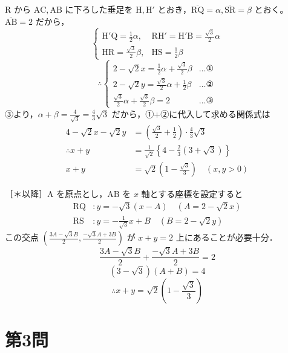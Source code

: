 \documentclass[../main.tex]{subfiles}
\begin{document}
$\mathrm{R}$ から $\mathrm{AC}, \mathrm{AB}$ に下ろした垂足を $\mathrm{H}, \mathrm{H'}$ とおき，$\overline{\mathrm{RQ}} = \alpha, \overline{\mathrm{SR}} = \beta$ とおく。$\overline{\mathrm{AB}} = 2$ だから，
\[
  \begin{cases}
    \mathrm{H'Q} = \frac{1}{2}\alpha, & \mathrm{RH'} = \mathrm{H'B} = \frac{\sqrt{3}}{2}\alpha \\[1ex]
    \mathrm{HR} = \frac{\sqrt{3}}{2}\beta, & \mathrm{HS} = \frac{1}{2}\beta
  \end{cases}
\]
\[
  \therefore
  \begin{cases}
    2 - \sqrt{2}x = \frac{1}{2}\alpha + \frac{\sqrt{3}}{2}\beta & \dots \text{①} \\[1ex]
    2 - \sqrt{2}y = \frac{\sqrt{3}}{2}\alpha + \frac{1}{2}\beta & \dots \text{②} \\[1ex]
    \frac{\sqrt{3}}{2}\alpha + \frac{\sqrt{3}}{2}\beta = 2 & \dots \text{③}
  \end{cases}
\]
③より，$\alpha + \beta = \frac{4}{\sqrt{3}} = \frac{4}{3}\sqrt{3}$ だから，①+②に代入して求める関係式は
\begin{align*}
  4 - \sqrt{2}x - \sqrt{2}y &= \left( \frac{\sqrt{3}}{2} + \frac{1}{2} \right) \cdot \frac{4}{3}\sqrt{3} \\
  \therefore x + y &= \frac{1}{\sqrt{2}} \left\{ 4 - \frac{2}{3}(3+\sqrt{3}) \right\} \\
  x + y &= \sqrt{2}\left( 1 - \frac{\sqrt{3}}{3} \right) \quad (x, y > 0)
\end{align*}

\bigskip

［＊以降］$\mathrm{A}$ を原点とし，$\mathrm{AB}$ を $x$ 軸とする座標を設定すると
\begin{align*}
  \mathrm{RQ} &: y = -\sqrt{3}(x - A) \quad (A = 2 - \sqrt{2}x) \\
  \mathrm{RS} &: y = -\frac{1}{\sqrt{3}}x + B \quad (B = 2 - \sqrt{2}y)
\end{align*}
この交点 $\left( \frac{3A - \sqrt{3}B}{2}, \frac{-\sqrt{3}A + 3B}{2} \right)$ が $x + y = 2$ 上にあることが必要十分．
\[
  \frac{3A - \sqrt{3}B}{2} + \frac{-\sqrt{3}A + 3B}{2} = 2
\]
\[
  (3 - \sqrt{3})(A + B) = 4
\]
\[
  \therefore x + y = \sqrt{2} \left( 1 - \frac{\sqrt{3}}{3} \right)
\]

\newpage

\section*{第3問}
\end{document}
